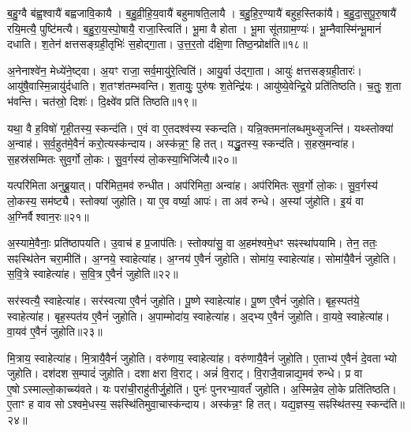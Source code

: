 ब॒हु॒ग्वै ब॑ह्व॒श्वायै॑ बह्वजावि॒कायै।
ब॒हु॒व्री॒हि॒य॒वायै॑ बहुमाषति॒लायै।
ब॒हु॒हि॒र॒ण्यायै॑ बहुह॒स्तिका॑यै।
ब॒हु॒दा॒स॒पू॒रु॒षायै॑ रयि॒मत्यै॒ पुष्टि॑मत्यै।
ब॒हु॒रा॒य॒स्पो॒षायै॒ राजा॒स्त्विति॑।
भू॒मा वै होता।
भू॒मा सू॑तग्राम॒ण्यः॑।
भू॒म्नैवास्मि॑न्भू॒मानं॑ दधाति।
श॒तेन॑ क्षत्तसङ्ग्रही॒तृभिः॑ स॒होद्गा॒ता।
उ॒त्त॒र॒तो द॑क्षि॒णा तिष्ठ॒न्प्रोक्ष॑ति॥१८॥

अ॒नेनाश्वे॑न॒ मेध्ये॑ने॒ष्ट्वा।
अ॒यꣳ राजा॒ सर्व॒मायु॑रे॒त्विति॑।
आयु॒र्वा उ॑द्गा॒ता।
आयुः॑ क्षत्तसङ्ग्रही॒तारः॑।
आयु॑षै॒वास्मि॒न्नायु॑र्दधाति।
श॒तꣳश॑तम्भवन्ति।
श॒तायुः॒ पुरु॑षः श॒तेन्द्रि॑यः।
आयु॑ष्ये॒वेन्द्रि॒ये प्रति॑तिष्ठति।
च॒तुः॒ श॒ता भ॑वन्ति।
चत॑स्रो॒ दिशः॑।
दि॒क्ष्वे॑व प्रति॑ तिष्ठति॥१९॥\anuvakamend[ब्र॒ह्मा वि॒श उ॑क्षति॒ दिश॒ एकं॑ च]

यथा॒ वै ह॒विषो॑ गृही॒तस्य॒ स्कन्द॑ति।
ए॒वं वा ए॒तदश्व॑स्य स्कन्दति।
यन्नि॒क्तमना॑लब्धमुथ्सृ॒जन्ति॑।
यथ्स्तोक्या॑ अ॒न्वाह॑।
स॒र्व॒हुत॑मे॒वैनं॑ करो॒त्यस्क॑न्दाय।
अस्क॑न्न॒ꣳ॒ हि तत्।
यद्धु॒तस्य॒ स्कन्द॑ति।
स॒हस्र॒मन्वा॑ह।
स॒हस्र॑सम्मितः सुव॒र्गो लो॒कः।
सु॒व॒र्गस्य॑ लो॒कस्या॒भिजि॑त्यै॥२०॥

यत्परि॑मिता अनुब्रू॒यात्।
परि॑मित॒मव॑ रुन्धीत।
अप॑रिमिता॒ अन्वा॑ह।
अप॑रिमितः सुव॒र्गो लो॒कः।
सु॒व॒र्गस्य॑ लो॒कस्य॒ सम॑ष्ट्यै।
स्तोक्या॑ जुहोति।
या ए॒व वर्ष्या॒ आपः॑।
ता अव॑ रुन्धे।
अ॒स्यां जु॑होति।
इ॒यं वा अ॒ग्निर्वैश्वान॒रः॥२१॥

अ॒स्यामे॒वैनाः॒ प्रति॑ष्ठापयति।
उ॒वाच॑ ह प्र॒जाप॑तिः।
स्तोक्या॑सु॒ वा अ॒हम॑श्वमे॒धꣳ सꣴस्था॑पयामि।
तेन॒ ततः॒ सꣴस्थि॑तेन चरा॒मीति॑।
अ॒ग्नये॒ स्वाहेत्या॑ह।
अ॒ग्नय॑ ए॒वैनं॑ जुहोति।
सोमा॑य॒ स्वाहेत्या॑ह।
सोमा॑यै॒वैनं॑ जुहोति।
स॒वि॒त्रे स्वाहेत्या॑ह।
स॒वि॒त्र ए॒वैनं॑ जुहोति॥२२॥

सर॑स्वत्यै॒ स्वाहेत्या॑ह।
सर॑स्वत्या ए॒वैनं॑ जुहोति।
पू॒ष्णे स्वाहेत्या॑ह।
पू॒ष्ण ए॒वैनं॑ जुहोति।
बृह॒स्पत॑ये॒ स्वाहेत्या॑ह।
बृह॒स्पत॑य ए॒वैनं॑ जुहोति।
अ॒पाम्मोदा॑य॒ स्वाहेत्या॑ह।
अ॒द्भ्य ए॒वैनं॑ जुहोति।
वा॒यवे॒ स्वाहेत्या॑ह।
वा॒यव॑ ए॒वैनं॑ जुहोति॥२३॥

मि॒त्राय॒ स्वाहेत्या॑ह।
मि॒त्रायै॒वैनं॑ जुहोति।
वरु॑णाय॒ स्वाहेत्या॑ह।
वरु॑णायै॒वैनं॑ जुहोति।
ए॒ताभ्य॑ ए॒वैनं॑ दे॒वताभ्यो जुहोति।
दश॑दश स॒म्पादं॑ जुहोति।
दशाक्षरा वि॒राट्।
अन्नं॑ वि॒राट्।
वि॒राजै॒वान्नाद्य॒मव॑ रुन्धे।
प्र वा ए॒षो\-ऽस्माल्लो॒काच्च्य॑वते।
यः परा॑ची॒राहु॑तीर्जु॒होति॑।
पुनः॑ पुनरभ्या॒वर्तं॑ जुहोति।
अ॒स्मिन्ने॒व लो॒के प्रति॑तिष्ठति।
ए॒ताꣳ ह वाव सो\-ऽश्वमे॒धस्य॒ सꣴस्थि॑तिमुवा॒चास्क॑न्दाय।
अस्क॑न्न॒ꣳ हि तत्।
यद्य॒ज्ञस्य॒ सꣴस्थि॑तस्य॒ स्कन्द॑ति॥२४॥\anuvakamend[अ॒भिजि॑त्यै वैश्वान॒रः स॑वि॒त्र ए॒वैनं॑ जुहोति वा॒यव॑ ए॒वैनं॑ जुहोति च्यवते॒ षट् च॑]

